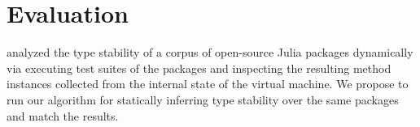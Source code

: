 \documentclass[sigplan,screen]{acmart}
\begin{document}
\section{Evaluation}%
\label{sec:eval}

\citet{Pelenitsyn21} analyzed the type stability of a corpus of open-source Julia
packages dynamically via executing test suites of the packages and inspecting the
resulting method instances collected from the internal state of the virtual
machine. We propose to run our algorithm for statically inferring type stability
over the same packages and match the results.



\end{document}

